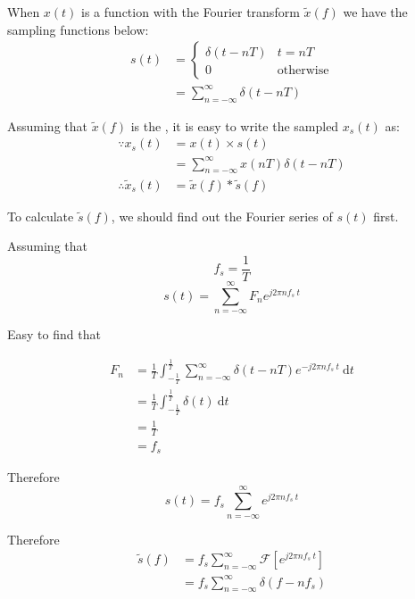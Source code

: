 \documentclass{article}
\begin{document}
When $x(t)$ is a function with the Fourier transform $\widetilde{x}(f)$
we have the sampling functions below:
\begin{align}
    s(t) &= 
    \left\{ 
        \begin{array}{lr}
            \delta(t - nT) & t = nT\\
            0 & \mathrm{otherwise}
        \end{array}
    \right. \nonumber \\
    &= \sum_{n = -\infty}^{\infty} \delta(t - nT)
\end{align}

Assuming that $\widetilde{x}(f)$ is the , it is easy to write the sampled $x_s(t)$ as:
\begin{align}
    \because x_s(t) &= x(t)\times s(t) \nonumber \\
    &= \sum_{n = -\infty}^{\infty} x(nT) \delta(t - nT) \label{xst} \\
    \therefore \widetilde{x}_s(t) &= \widetilde{x}(f) * \widetilde{s}(f) \label{xn}
\end{align}

To calculate $\widetilde{s}(f)$, we should find out the Fourier series of ${s}(t)$ first.

Assuming that 
$$
f_s = \frac{1}{T}
$$
$$
{s}(t) = \sum_{n = -\infty}^{\infty} F_n e^{j2\pi n f_s ~ t}
$$

Easy to find that

\begin{align*}
    F_n &= \frac{1}{T} \int_{- \frac{1}{T}}^{\frac{1}{T}} \sum_{n = -\infty}^{\infty} \delta(t - nT) e^{-j2\pi n f_s ~ t} ~\mathrm{d}t\\
    &= \frac{1}{T} \int_{- \frac{1}{T}}^{\frac{1}{T}} \delta(t) ~\mathrm{d}t \\
    &= \frac{1}{T} \\
    &= f_s
\end{align*}

Therefore
$$
    {s}(t) = f_s \sum_{n = -\infty}^{\infty}e^{j2\pi n f_s ~ t}
$$

Therefore
\begin{align}
    \widetilde{s}(f) &= f_s \sum_{n = -\infty}^{\infty} \mathcal{F} \left[ e^{j2\pi n f_s ~ t} \right]  \nonumber \\
    &= f_s \sum_{n = -\infty}^{\infty} \delta(f - nf_s)
    \label{sf}
\end{align}
\end{document}
